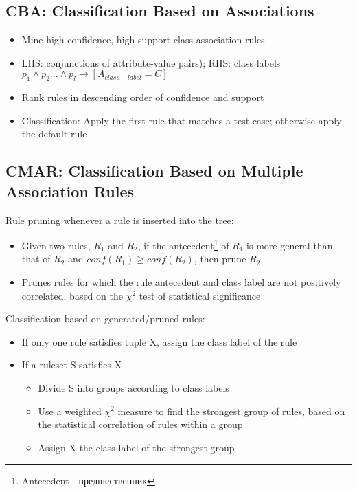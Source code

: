 \subsection{CBA: Classification Based on Associations}
\begin{itemize}
\item Mine high-confidence, high-support class association rules
\item LHS: conjunctions of attribute-value pairs); RHS: class labels\\
$p_1 \wedge p_2 ... \wedge p_l \to \left[A_{class-label} = C\right]$
\item Rank rules in descending order of confidence and support
\item Classification: Apply the first rule that matches a test case; otherwise apply the default rule
\end{itemize}

\subsection{CMAR: Classification Based on Multiple Association Rules}
Rule pruning whenever a rule is inserted into the tree:
\begin{itemize}
\item Given two rules, $R_1$ and $R_2$, if the antecedent\footnote{Antecedent - предшественник} of $R_1$ is more general than that of $R_2$ and $conf(R_1) \geqslant conf(R_2)$, then prune $R_2$
\item Prunes rules for which the rule antecedent and class label are not positively correlated, based on the $\chi^2$ test of statistical significance
\end{itemize}

Classification based on generated/pruned rules:
\begin{itemize}
\item If only one rule satisfies tuple X, assign the class label of the rule \item If a ruleset S satisfies X
\begin{itemize}
\item Divide S into groups according to class labels
\item Use a weighted $\chi^2$ measure to find the strongest group of rules, based on the statistical correlation of rules within a group
\item Assign X the class label of the strongest group
\end{itemize}
\end{itemize}

